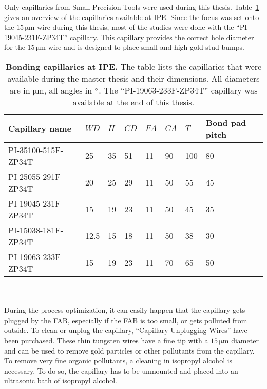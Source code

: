 Only capillaries from Small Precision Tools were used during this thesis. Table~\ref{tab:capillaries} gives an overview of the capillaries available at \ac{IPE}. Since the focus was set onto the $15\,\si{\micro \meter}$ wire during this thesis, most of the studies were done with the ``PI-19045-231F-ZP34T'' capillary. This capillary provides the correct hole diameter for the $15\,\si{\micro \meter}$ wire and is designed to place small and high gold-stud bumps.
\begin{table}
\caption[Bonding capillaries available at IPE]{\textbf{Bonding capillaries at \ac{IPE}.} The table lists the capillaries that were available during the master thesis and their dimensions. All diameters are in $\si{\micro \meter}$, all angles in $^{\rm{\circ }}$. The ``PI-19063-233F-ZP34T'' capillary was available at the end of this thesis.}\label{tab:capillaries}
\begin{center}
\begin{tabular}{llllllll}
\toprule
Capillary name&$WD$&$H$&$CD$&$FA$&$CA$&$T$&Bond pad pitch\\
\midrule
PI-35100-515F-ZP34T&25&35&51&11&90&100&80\\
PI-25055-291F-ZP34T&20&25&29&11&50&55&45\\
PI-19045-231F-ZP34T&15&19&23&11&50&45&35\\
PI-15038-181F-ZP34T&12.5&15&18&11&50&38&30\\
PI-19063-233F-ZP34T&15&19&23&11&70&65&50\\
\bottomrule
\end{tabular}
\end{center}
\end{table}
\\
\\During the process optimization, it can easily happen that the capillary gets plugged by the \ac{FAB}, especially if the \ac{FAB} is too small, or gets polluted from outside. To clean or unplug the capillary, ``Capillary Unplugging Wires'' have been purchased. These thin tungsten wires have a fine tip with a $15\,\si{\micro \meter}$ diameter and can be used to remove gold particles or other pollutants from the capillary. To remove very fine organic pollutants, a cleaning in isopropyl alcohol is necessary. To do so, the capillary has to be unmounted and placed into an ultrasonic bath of isopropyl alcohol.%

